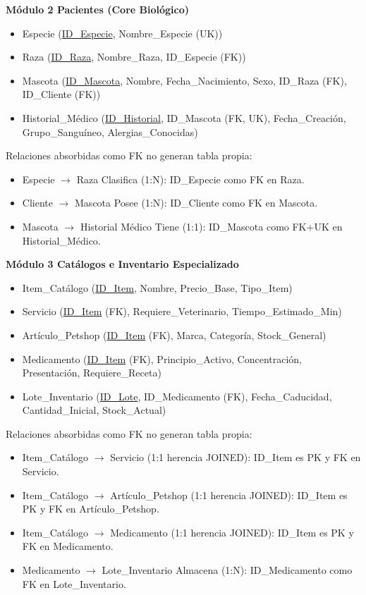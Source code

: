 \vspace{0.5cm}
\noindent \textbf{Módulo 2 Pacientes (Core Biológico)}

\begin{itemize}
	\item Especie (\underline{ID\_Especie}, Nombre\_Especie (UK))
	\item Raza (\underline{ID\_Raza}, Nombre\_Raza, ID\_Especie (FK))
	\item Mascota (\underline{ID\_Mascota}, Nombre, Fecha\_Nacimiento, Sexo, ID\_Raza (FK), ID\_Cliente (FK))
	\item Historial\_Médico (\underline{ID\_Historial}, ID\_Mascota (FK, UK), Fecha\_Creación, Grupo\_Sanguíneo, Alergias\_Conocidas)
\end{itemize}

Relaciones absorbidas como FK no generan tabla propia:
\begin{itemize}
	\item Especie $\rightarrow$ Raza Clasifica (1:N): ID\_Especie como FK en Raza.
	\item Cliente $\rightarrow$ Mascota Posee (1:N): ID\_Cliente como FK en Mascota.
	\item Mascota $\rightarrow$ Historial Médico Tiene (1:1): ID\_Mascota como FK+UK en Historial\_Médico.
\end{itemize}

\vspace{0.5cm}
\noindent \textbf{Módulo 3 Catálogos e Inventario Especializado}

\begin{itemize}
	\item Item\_Catálogo (\underline{ID\_Item}, Nombre, Precio\_Base, Tipo\_Item)
	\item Servicio (\underline{ID\_Item} (FK), Requiere\_Veterinario, Tiempo\_Estimado\_Min)
	\item Artículo\_Petshop (\underline{ID\_Item} (FK), Marca, Categoría, Stock\_General)
	\item Medicamento (\underline{ID\_Item} (FK), Principio\_Activo, Concentración, Presentación, Requiere\_Receta)
	\item Lote\_Inventario (\underline{ID\_Lote}, ID\_Medicamento (FK), Fecha\_Caducidad, Cantidad\_Inicial, Stock\_Actual)
\end{itemize}

Relaciones absorbidas como FK no generan tabla propia:
\begin{itemize}
	\item Item\_Catálogo $\rightarrow$ Servicio (1:1 herencia JOINED): ID\_Item es PK y FK en Servicio.
	\item Item\_Catálogo $\rightarrow$ Artículo\_Petshop (1:1 herencia JOINED): ID\_Item es PK y FK en Artículo\_Petshop.
	\item Item\_Catálogo $\rightarrow$ Medicamento (1:1 herencia JOINED): ID\_Item es PK y FK en Medicamento.
	\item Medicamento $\rightarrow$ Lote\_Inventario Almacena (1:N): ID\_Medicamento como FK en Lote\_Inventario.
\end{itemize}

